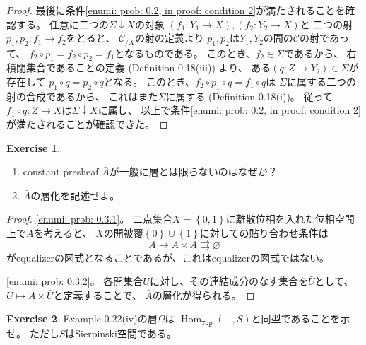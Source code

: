 \documentclass[uplatex]{jsarticle}
\theoremstyle{definition}
\newtheorem{prob}[prob]{Exercise}
\renewcommand{\emptyset}{\varnothing}
\DeclareMathOperator{\Hom}{Hom}
\def\mcC{\mathcal{C}}
\DeclareMathOperator{\sfTop}{\mathtt{Top}}
\begin{document}
\begin{proof}
  最後に条件\ref{enumi: prob: 0.2, in proof: condition 2}が満たされることを確認する。
  任意に二つの\(\Sigma\downarrow X\)の対象
  \((f_1:Y_1\to X), (f_2:Y_2\to X)\)と
  二つの射\(p_1,p_2:f_1\to f_2\)をとると、
  \(\mcC_{/X}\)の射の定義より
  \(p_1,p_2\)は\(Y_1,Y_2\)の間の\(\mcC\)の射であって、
  \(f_2\circ p_1 = f_2\circ p_2 = f_1\)となるものである。
  このとき、\(f_2\in \Sigma\)であるから、
  右積閉集合であることの定義 (Definition 0.18(iii)) より、
  ある\((q:Z\to Y_2)\in \Sigma\)が存在して
  \(p_1\circ q = p_2 \circ q\)となる。
  このとき、\(f_2 \circ p_1\circ q = f_1 \circ q\)は
  \(\Sigma\)に属する二つの射の合成であるから、
  これはまた\(\Sigma\)に属する (Definition 0.18(i))。
  従って\(f_1\circ q:Z\to X\)は\(\Sigma\downarrow X\)に属し、
  以上で条件\ref{enumi: prob: 0.2, in proof: condition 2}が満たされることが確認できた。
\end{proof}


\begin{prob}\label{prob: 0.3}
  \
  \begin{enumerate}
    \item \label{enumi: prob: 0.3.1}
    constant presheaf \(\bar{A}\)が一般に層とは限らないのはなぜか？
    \item \label{enumi: prob: 0.3.2}
    \(\bar{A}\)の層化を記述せよ。
  \end{enumerate}
\end{prob}

\begin{proof}
  \ref{enumi: prob: 0.3.1}。
  二点集合\(X = \left\{ 0,1 \right\}\)に離散位相を入れた位相空間上で\(\bar{A}\)を考えると、
  \(X\)の開被覆\(\left\{ 0\right\} \cup \left\{ 1 \right\}\)に対しての貼り合わせ条件は
  \[
  A \to A\times A \rightrightarrows \emptyset
  \]
  がequalizerの図式となることであるが、これはequalizerの図式ではない。

  \ref{enumi: prob: 0.3.2}。
  各開集合\(U\)に対し、その連結成分のなす集合を\(\bar{U}\)として、
  \(U\mapsto A\times \bar{U}\)と定義することで、
  \(\bar{A}\)の層化が得られる。
\end{proof}






\begin{prob}\label{prob: 0.4}
  Example 0.22(iv)の層\(\Omega\)は
  \(\Hom_{\sfTop}(-,S)\)と同型であることを示せ。
  ただし\(S\)はSierpinski空間である。
\end{prob}
\end{document}
